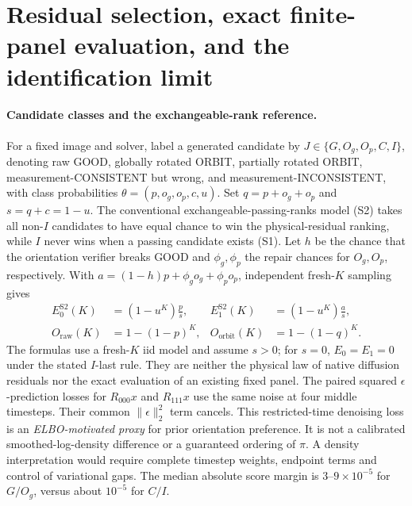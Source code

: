 \section{Residual selection, exact finite-panel evaluation, and the identification limit}
\label{sec:suppl-selection}

\paragraph{Candidate classes and the exchangeable-rank reference.}
For a fixed image and solver, label a generated candidate by
$J\in\{G,O_g,O_p,C,I\}$, denoting raw GOOD, globally rotated
ORBIT, partially rotated ORBIT, measurement-CONSISTENT but wrong,
and measurement-INCONSISTENT, with class probabilities
$\theta=(p,o_g,o_p,c,u)$.
Set $q=p+o_g+o_p$ and $s=q+c=1-u$.
The conventional exchangeable-passing-ranks model (S2) takes all
non-$I$ candidates to have equal chance to win the physical-residual
ranking, while $I$ never wins when a passing candidate exists (S1).
Let $h$ be the chance that the orientation verifier breaks GOOD and
$\phi_g,\phi_p$ the repair chances for $O_g,O_p$, respectively. With
$a=(1-h)p+\phi_go_g+\phi_po_p$, independent fresh-$K$ sampling gives
\begin{align}
 E_0^{\mathrm{S2}}(K)&=(1-u^K)\frac{p}{s}, &
 E_1^{\mathrm{S2}}(K)&=(1-u^K)\frac{a}{s},\label{eq:suppl-S3-S2}\\
 O_{\mathrm{raw}}(K)&=1-(1-p)^K, &
 O_{\mathrm{orbit}}(K)&=1-(1-q)^K.\label{eq:suppl-S3-oracle}
\end{align}
The formulas use a fresh-$K$ iid model and assume $s>0$;
for $s=0$, $E_0=E_1=0$ under the stated $I$-last rule.
They are neither the physical law of native diffusion residuals nor
the exact evaluation of an existing fixed panel.
The paired squared $\epsilon$-prediction losses for $R_{000}x$
and $R_{111}x$ use the same noise at four middle timesteps.
Their common $\|\epsilon\|_2^2$ term cancels.
This restricted-time denoising loss is an
\emph{ELBO-motivated proxy} for prior orientation preference.
It is not a calibrated smoothed-log-density difference
or a guaranteed ordering of $\pi$.
A density interpretation would require complete timestep weights,
endpoint terms and control of variational gaps.
The median absolute score margin is $3$--$9\times10^{-5}$
for $G/O_g$, versus about $10^{-5}$ for $C/I$.


